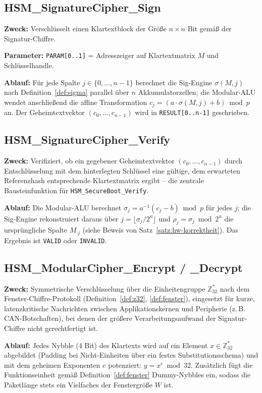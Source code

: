 ﻿\documentclass[a4paper,12pt]{article}
\theoremstyle{definition}
\begin{document}
\subsection{HSM\_SignatureCipher\_Sign}
\label{sec:funk-sign}

\textbf{Zweck:} Verschlüsselt einen Klartextblock der Größe $n \times n$ Bit gemäß der Signatur-Chiffre.

\textbf{Parameter:} \texttt{PARAM[0..1]} = Adresszeiger auf Klartextmatrix $M$ und Schlüsselhandle.

\textbf{Ablauf:} Für jede Spalte $j \in \{0,\ldots,n-1\}$ berechnet die Sig-Engine $\sigma(M,j)$ nach Definition~\ref{def:sigma} parallel über $n$ Akkumulatorzellen; die Modular-ALU wendet anschließend die affine Transformation $c_j = (a \cdot \sigma(M,j) + b) \bmod p$ an. Der Geheimtextvektor $(c_0,\ldots,c_{n-1})$ wird in \texttt{RESULT[0..n-1]} geschrieben.

\subsection{HSM\_SignatureCipher\_Verify}

\textbf{Zweck:} Verifiziert, ob ein gegebener Geheimtextvektor $(c_0,\ldots,c_{n-1})$ durch Entschlüsselung mit dem hinterlegten Schlüssel eine gültige, dem erwarteten Referenzhash entsprechende Klartextmatrix ergibt -- die zentrale Bausteinfunktion für \texttt{HSM\_SecureBoot\_Verify}.

\textbf{Ablauf:} Die Modular-ALU berechnet $\sigma_j = a^{-1}(c_j - b) \bmod p$ für jedes $j$; die Sig-Engine rekonstruiert daraus über $j = \lfloor \sigma_j / 2^n \rfloor$ und $\rho_j = \sigma_j \bmod 2^n$ die ursprüngliche Spalte $M_{\cdot j}$ (siehe Beweis von Satz~\ref{satz:hw-korrektheit}). Das Ergebnis ist \texttt{VALID} oder \texttt{INVALID}.

\subsection{HSM\_ModularCipher\_Encrypt / \_Decrypt}

\textbf{Zweck:} Symmetrische Verschlüsselung über die Einheitengruppe $\mathbb{Z}_{32}^*$ nach dem Fenster-Chiffre-Protokoll (Definition~\ref{def:z32}, \ref{def:fenster}), eingesetzt für kurze, latenzkritische Nachrichten zwischen Applikationskernen und Peripherie (z.\,B. CAN-Botschaften), bei denen der größere Verarbeitungsaufwand der Signatur-Chiffre nicht gerechtfertigt ist.

\textbf{Ablauf:} Jedes Nybble (4 Bit) des Klartexts wird auf ein Element $x \in \mathbb{Z}_{32}^*$ abgebildet (Padding bei Nicht-Einheiten über ein festes Substitutionsschema) und mit dem geheimen Exponenten $e$ potenziert: $y = x^e \bmod 32$. Zusätzlich fügt die Funktionseinheit gemäß Definition~\ref{def:fenster} Dummy-Nybbles ein, sodass die Paketlänge stets ein Vielfaches der Fenstergröße $W$ ist.
\end{document}
